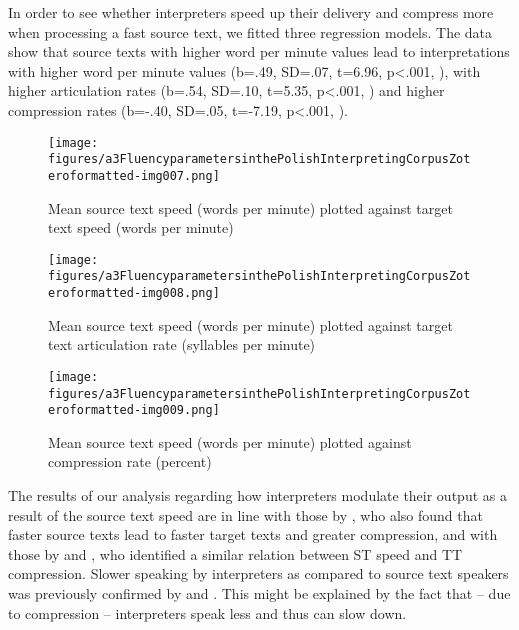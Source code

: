 \documentclass[output=paper]{langscibook}
\begin{document}
In order to see whether interpreters speed up their delivery and compress more when processing a fast source text, we fitted three regression models. The data show that source texts with higher word per minute values lead to interpretations with higher word per minute values
(b=.49, SD=.07, t=6.96, p<.001, ), with higher articulation rates
(b=.54, SD=.10, t=5.35, p<.001, ) and higher compression rates
(b=-.40, SD=.05, t=-7.19, p<.001, ).

 

 
 \begin{figure}
\texttt{[image: figures/a3FluencyparametersinthePolishInterpretingCorpusZoteroformatted-img007.png]}
\caption{
Mean source text speed (words per minute) plotted against target text speed (words per minute)
}
\label{fig:chmiel:7}
\end{figure}
   
   

 \begin{figure}   
\texttt{[image: figures/a3FluencyparametersinthePolishInterpretingCorpusZoteroformatted-img008.png]}
 

\caption{
Mean source text speed (words per minute) plotted against target text articulation rate (syllables per minute)
}
\label{fig:chmiel:8}
\end{figure}
   
   
 \begin{figure}
\texttt{[image: figures/a3FluencyparametersinthePolishInterpretingCorpusZoteroformatted-img009.png]}
 

\caption{
Mean source text speed (words per minute) plotted against compression rate (percent)
}
\label{fig:chmiel:9}
\end{figure}

The results of our analysis regarding how interpreters modulate their output as a result of the source text speed are in line with those by \citet{Russo2018}, who also found that faster source texts lead to faster target texts and greater compression, and with those by \citet{Gerver1969} and \citet{BarghoutEtAl2015}, who identified a similar relation between ST speed and TT compression. Slower speaking by interpreters as compared to source text speakers was previously confirmed by \citet{Russo2018} and \citet{Christodoulides2013}. This might be explained by the fact that – due to compression – interpreters speak less and thus can slow down. 
\end{document}
